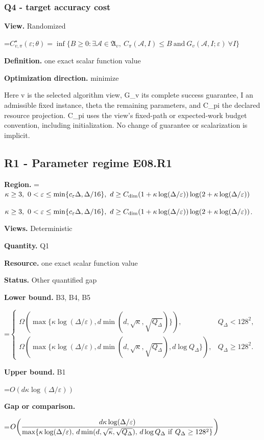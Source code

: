 \documentclass[10pt,a4paper]{article}
\newcommand{\AtlasMath}[1]{\par\begingroup\centering\setbox0=\hbox{$\displaystyle #1$}\ifdim\wd0>1.4\linewidth\typeout{ATLAS WIDE FORMULA: \the\wd0}\fi\ifdim\wd0>\linewidth\resizebox{\linewidth}{!}{\box0}\else\box0\fi\par\endgroup}
\newcommand{\AtlasInlineMath}[1]{\begingroup\setbox0=\hbox{$#1$}\ifdim\wd0>.4\linewidth\endgroup\AtlasMath{#1}\else\endgroup$#1$\fi}
\begin{document}
\subsubsection{Q4 - target accuracy cost}
\textbf{View.} Randomized

\AtlasMath{C^\star_{v,\pi}(\varepsilon;\theta)=\inf\{B\ge0:\exists\mathcal A\in\mathfrak A_v,\ C_\pi(\mathcal A,I)\le B\ \text{and}\ G_v(\mathcal A,I;\varepsilon)\ \forall I\}}
\textbf{Definition.} one exact scalar function value

\textbf{Optimization direction.} minimize

Here v is the selected algorithm view, G\_v its complete success guarantee, I an admissible fixed instance, theta the remaining parameters, and C\_pi the declared resource projection. C\_pi uses the view's fixed-path or expected-work budget convention, including initialization. No change of guarantee or scalarization is implicit.

\subsection{R1 - Parameter regime E08.R1}
\textbf{Region.} \AtlasInlineMath{\kappa\ge3,\ 0<\varepsilon\le\min\{c_\varepsilon\Delta,\Delta/16\},\ d\ge C_{\rm dim}(1+\kappa\log(\Delta/\varepsilon))\log(2+\kappa\log(\Delta/\varepsilon))}.

\textbf{Views.} Deterministic

\textbf{Quantity.} Q1

\textbf{Resource.} one exact scalar function value

\textbf{Status.} Other quantified gap

\textbf{Lower bound.} B3, B4, B5

\AtlasMath{\begin{cases}\Omega(\max\{\kappa\log(\Delta/\varepsilon),d\min(d,\sqrt\kappa,\sqrt{Q_\Delta})\}),&Q_\Delta<128^2,\\\Omega(\max\{\kappa\log(\Delta/\varepsilon),d\min(d,\sqrt\kappa,\sqrt{Q_\Delta}),d\log Q_\Delta\}),&Q_\Delta\ge128^2.\end{cases}}
\textbf{Upper bound.} B1

\AtlasMath{O(d\kappa\log(\Delta/\varepsilon))}
\textbf{Gap or comparison.} 
\AtlasMath{O\!\left(\frac{d\kappa\log(\Delta/\varepsilon)}{\max\{\kappa\log(\Delta/\varepsilon),\,d\min(d,\sqrt\kappa,\sqrt{Q_\Delta}),\,d\log Q_\Delta\ {\rm if}\ Q_\Delta\ge128^2\}}\right)}
\end{document}
